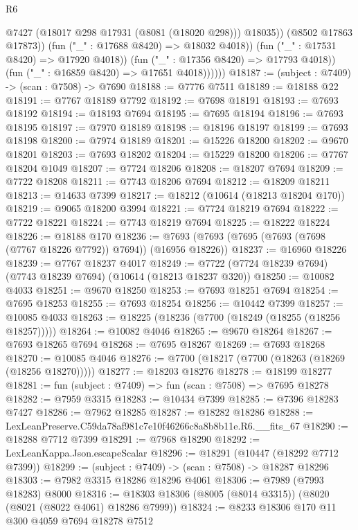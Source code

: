 \begin{lexlean}{R6}
\begin{coremodule}
                          @7427
                          (@18017 @298 @17931 (@8081 (@18020 @298)))
                          @18035))
                      (@8502 @17863 @17873))
                    (fun ("_" : @17688 @8420) => @18032 @4018))
                  (fun ("_" : @17531 @8420) => @17920 @4018))
                (fun ("_" : @17356 @8420) => @17793 @4018))
              (fun ("_" : @16859 @8420) => @17651 @4018))))))
@18187 := (subject : @7409) -> (scan : @7508) -> @7690
@18188 := @7776 @7511
@18189 := @18188 @22
@18191 := @7767 @18189 @7792
@18192 := @7698 @18191
@18193 := @7693 @18192
@18194 := @18193 @7694
@18195 := @7695 @18194
@18196 := @7693 @18195
@18197 := @7970 @18189
@18198 := @18196 @18197
@18199 := @7693 @18198
@18200 := @7974 @18189
@18201 := @15226 @18200
@18202 := @9670 @18201
@18203 := @7693 @18202
@18204 := @15229 @18200
@18206 := @7767 @18204 @1049
@18207 := @7724 @18206
@18208 := @18207 @7694
@18209 := @7722 @18208
@18211 := @7743 @18206 @7694
@18212 := @18209 @18211
@18213 := @14633 @7399
@18217 := @18212 (@10614 (@18213 @18204 @170))
@18219 := @9065 @18200 @3994
@18221 := @7724 @18219 @7694
@18222 := @7722 @18221
@18224 := @7743 @18219 @7694
@18225 := @18222 @18224
@18226 := @18188 @170
@18236 := @7693 (@7693 (@7695 (@7693 (@7698 (@7767 @18226 @7792)) @7694)) (@16956 @18226))
@18237 := @16960 @18226
@18239 := @7767 @18237 @4017
@18249 := @7722 (@7724 @18239 @7694) (@7743 @18239 @7694) (@10614 (@18213 @18237 @320))
@18250 := @10082 @4033
@18251 := @9670 @18250
@18253 := @7693 @18251 @7694
@18254 := @7695 @18253
@18255 := @7693 @18254
@18256 := @10442 @7399
@18257 := @10085 @4033
@18263 := @18225 (@18236 (@7700 (@18249 (@18255 (@18256 @18257)))))
@18264 := @10082 @4046
@18265 := @9670 @18264
@18267 := @7693 @18265 @7694
@18268 := @7695 @18267
@18269 := @7693 @18268
@18270 := @10085 @4046
@18276 := @7700 (@18217 (@7700 (@18263 (@18269 (@18256 @18270)))))
@18277 := @18203 @18276
@18278 := @18199 @18277
@18281 := fun (subject : @7409) => fun (scan : @7508) => @7695 @18278
@18282 := @7959 @3315
@18283 := @10434 @7399
@18285 := @7396 @18283 @7427
@18286 := @7962 @18285
@18287 := @18282 @18286
@18288 := LexLeanPreserve.C59da78af981c7e10f46266c8a8b8b11e.R6.__fits_67
@18290 := @18288 @7712 @7399
@18291 := @7968 @18290
@18292 := LexLeanKappa.Json.escapeScalar
@18296 := @18291 (@10447 (@18292 @7712 @7399))
@18299 := (subject : @7409) -> (scan : @7508) -> @18287 @18296
@18303 := @7982 @3315 @18286 @18296 @4061
@18306 := @7989 (@7993 @18283) @8000
@18316 := @18303 @18306 (@8005 (@8014 @3315)) (@8020 (@8021 (@8022 @4061) @18286 @7999))
@18324 := @8233 @18306 @170 @11 @300 @4059 @7694 @18278 @7512

\end{coremodule}
\end{lexlean}
